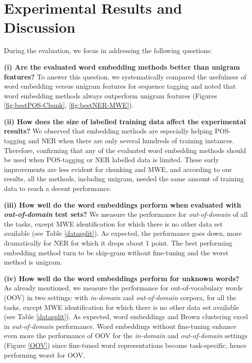 \section{Experimental Results and Discussion}
During the evaluation, we focus in addressing the following questions:

\textbf{(i) Are the evaluated word embedding methods better than unigram features?}
To answer this question, we systematically compared the usefulness of word embedding versus
unigram features for sequence tagging and noted that word embedding methods always outperform 
unigram features (Figures \ref{fig:bestPOS-Chunk}, \ref{fig:bestNER-MWE}). 

\textbf{(ii) How does the size of labelled training data affect the experimental results?}
We observed that embedding methods are especially helping POS-tagging and NER when there are only several hundreds of training instances. 
Therefore, confirming that any of the evaluated word embedding methods should be used when POS-tagging or NER labelled data is limited.
These early improvements are less evident for chunking and MWE, and according to our results, all the methods, including unigram, needed the same amount of training data to reach a decent performance.

\textbf{(iii) How well do the word embeddings perform when evaluated with \textit{out-of-domain} test sets?}
We measure the performance for \textit{out-of-domain} of all the tasks, except MWE identification for which there is no other data set available (see Table \ref{datasplit}).
As expected, the performance goes down, more dramatically for NER for which it drops
about 1 point. The best performing embedding method turn to be skip-gram without fine-tuning and the worst method is unigram.

\textbf{(iv) How well do the word embeddings perform for unknown words?}
As already mentioned, we measure the performance for out-of-vocabulary words (OOV)
in two settings: with \textit{in-domain} and \textit{out-of-domain} corpora, for all the tasks, except MWE identification for which there is no other data set available (see Table \ref{datasplit}).
As expected, word embeddings and Brown clustering excel in \textit{out-of-domain} performance.
Word embeddings without fine-tuning enhance even more the performance of OOV 
for the \textit{in-domain} and \textit{out-of-domain} settings (Figure \ref{OOV}) since fine-tuned
word representations become task-specific, hence performing worst for OOV.

